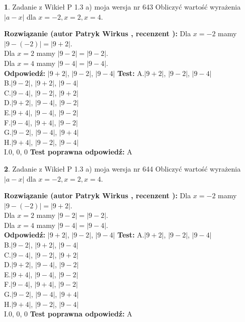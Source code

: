 \documentclass[12pt, a4paper]{article}
\theoremstyle{definition} %
\newtheorem{zad}{}
\newcommand{\zadStart}[1]{\begin{zad}#1\newline}
\newcommand{\zadStop}{\end{zad}}
\newcommand{\rozwStart}[2]{\noindent \textbf{Rozwiązanie (autor #1 , recenzent #2): }\newline}
\newcommand{\rozwStop}{\newline}
\newcommand{\odpStart}{\noindent \textbf{Odpowiedź:}\newline}
\newcommand{\odpStop}{\newline}
\newcommand{\testStart}{\noindent \textbf{Test:}\newline}
\newcommand{\testStop}{\newline}
\newcommand{\kluczStart}{\noindent \textbf{Test poprawna odpowiedź:}\newline}
\newcommand{\kluczStop}{\newline}
\begin{document}
\zadStart{Zadanie z Wikieł P 1.3 a) moja wersja nr 643}
Obliczyć wartość wyrażenia $|a - x|$ dla $x=-2,x=2,x=4$.
\zadStop
\rozwStart{Patryk Wirkus}{}
Dla $x = -2$ mamy $|9 - (-2)| = |9 + 2|$.\\
Dla $x = 2$ mamy $|9 - 2| = |9 - 2|$.\\
Dla $x = 4$ mamy $|9 - 4| = |9 - 4|$.\\
\rozwStop
\odpStart
$|9 + 2|$, $|9 - 2|$, $|9 - 4|$
\odpStop
\testStart
A.$|9 + 2|$, $|9 - 2|$, $|9 - 4|$\\
B.$|9 - 2|$, $|9 + 2|$, $|9 - 4|$\\
C.$|9 - 4|$, $|9 - 2|$, $|9 + 2|$\\
D.$|9 + 2|$, $|9 - 4|$, $|9 - 2|$\\
E.$|9 + 4|$, $|9 - 4|$, $|9 - 2|$\\
F.$|9 - 4|$, $|9 + 4|$, $|9 - 2|$\\
G.$|9 - 2|$, $|9 - 4|$, $|9 + 4|$\\
H.$|9 + 4|$, $|9 - 2|$, $|9 - 4|$\\
I.$0$, $0$, $0$
\testStop
\kluczStart
A
\kluczStop



\zadStart{Zadanie z Wikieł P 1.3 a) moja wersja nr 644}
Obliczyć wartość wyrażenia $|a - x|$ dla $x=-2,x=2,x=4$.
\zadStop
\rozwStart{Patryk Wirkus}{}
Dla $x = -2$ mamy $|9 - (-2)| = |9 + 2|$.\\
Dla $x = 2$ mamy $|9 - 2| = |9 - 2|$.\\
Dla $x = 4$ mamy $|9 - 4| = |9 - 4|$.\\
\rozwStop
\odpStart
$|9 + 2|$, $|9 - 2|$, $|9 - 4|$
\odpStop
\testStart
A.$|9 + 2|$, $|9 - 2|$, $|9 - 4|$\\
B.$|9 - 2|$, $|9 + 2|$, $|9 - 4|$\\
C.$|9 - 4|$, $|9 - 2|$, $|9 + 2|$\\
D.$|9 + 2|$, $|9 - 4|$, $|9 - 2|$\\
E.$|9 + 4|$, $|9 - 4|$, $|9 - 2|$\\
F.$|9 - 4|$, $|9 + 4|$, $|9 - 2|$\\
G.$|9 - 2|$, $|9 - 4|$, $|9 + 4|$\\
H.$|9 + 4|$, $|9 - 2|$, $|9 - 4|$\\
I.$0$, $0$, $0$
\testStop
\kluczStart
A
\kluczStop
\end{document}
